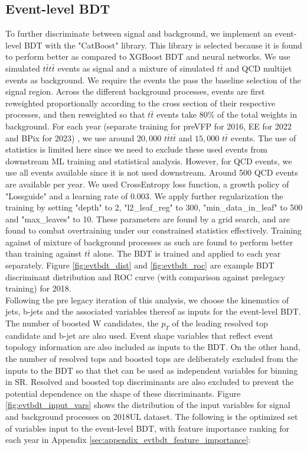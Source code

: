 \documentclass[twoside]{article}
\begin{document}
\subsection{Event-level BDT}
To further discriminate between signal and background, we implement an event-level BDT with the "CatBoost" library. This library is selected because it is found to perform better as compared to XGBoost BDT and neural networks. We use simulated $t\bar{t}t\bar{t}$ events as signal and a mixture of simulated $t\bar{t}$ and QCD multijet events as background. We require the events the pass the baseline selection of the signal region. Across the different background processes, events are first reweighted proportionally according to the cross section of their respective processes, and then reweighted so that $t\bar{t}$ events take 80\% of the total weights in background. For each year (separate training for preVFP for 2016, EE for 2022 and BPix for 2023) , we use around $20,000$ $t\bar{t}t\bar{t}$ and $15,000$ $t\bar{t}$ events. The use of statistics is limited here since we need to exclude these used events from downstream ML training and statistical analysis. However, for QCD events, we use all events available since it is not used downstream. Around 500 QCD events are available per year. We used CrossEntropy loss function, a growth policy of "Lossguide" and a learning rate of 0.003. We apply further regularization the training by setting "depth" to 2, "l2\_leaf\_reg" to 300, "min\_data\_in\_leaf" to 500 and "max\_leaves" to 10. These parameters are found by a grid search, and are found to combat overtraining under our constrained statistics effectively. Training against of mixture of background processes as such are found to perform better than training against $t\bar{t}$ alone. The BDT is trained and applied to each year separately. Figure \ref{fig:evtbdt_dist} and \ref{fig:evtbdt_roc} are example BDT discriminant distribution and ROC curve (with comparison against prelegacy training) for 2018.\\

Following the pre legacy iteration of this analysis, we choose the kinematics of jets, b-jets and the associated variables thereof as inputs for the event-level BDT. The number of boosted W candidates, the $p_T$ of the leading resolved top candidate and b-jet are also used. Event shape variables that reflect event topology information are also included as inputs to the BDT. On the other hand, the number of resolved tops and boosted tops are deliberately excluded from the inputs to the BDT so that thet can be used as independent variables for binning in SR. Resolved and boosted top discriminants are also excluded to prevent the potential dependence on the shape of these discriminants. Figure \ref{fig:evtbdt_input_vars} shows the distribution of the input variables for signal and background processes on 2018UL dataset. The following is the optimized set of variables input to the event-level BDT, with feature importance ranking for each year in Appendix \ref{sec:appendix_evtbdt_feature_importance}:\\
\end{document}
